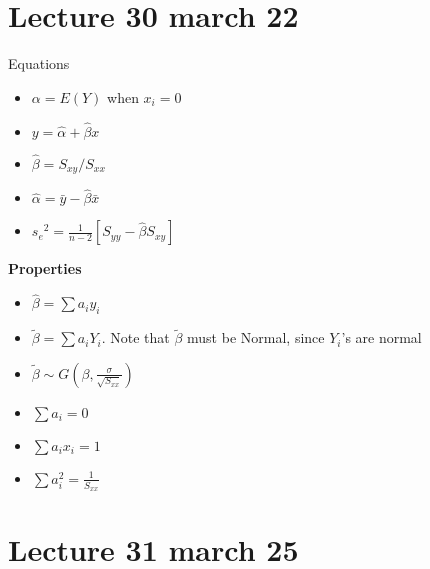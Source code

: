 \documentclass[10pt,letter]{article}
\theoremstyle{plain}
\theoremstyle{definition}
\begin{document}
\section*{Lecture 30 march 22}
Equations
\begin{itemize}
    \item $\alpha=E(Y)$ when $x_i=0$
    \item $y=\hat\alpha+\hat\beta x$ 
    \item $\hat\beta=S_{xy}/S_{xx}$ 
    \item $\hat\alpha=\bar{y}-\hat\beta\bar{x}$ 
    \item ${s_e}^2=\frac{1}{n-2}[S_{yy}-\hat\beta S_{xy}]$ 
\end{itemize}
\textbf{Properties}
\begin{itemize}
    \item $\hat{\beta}=\sum a_iy_i$ 
    \item $\tilde{\beta}=\sum a_iY_i$. Note that $\tilde\beta$ must be Normal, since $Y_i$'s are normal
    \item $\tilde{\beta}\sim G(\beta,\frac{\sigma}{\sqrt{S_{xx}}})$
    \item $\sum a_i=0$ 
    \item $\sum a_ix_i=1$ 
    \item $\sum a_i^2=\frac{1}{S_{xx}}$
\end{itemize}

\section*{Lecture 31 march 25}
\end{document}
